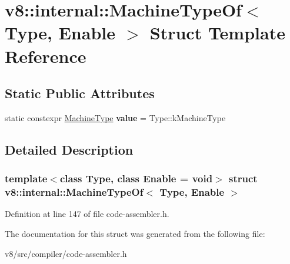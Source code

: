 \hypertarget{structv8_1_1internal_1_1MachineTypeOf}{}\section{v8\+:\+:internal\+:\+:Machine\+Type\+Of$<$ Type, Enable $>$ Struct Template Reference}
\label{structv8_1_1internal_1_1MachineTypeOf}
\subsection*{Static Public Attributes}
\begin{DoxyCompactItemize}
\item 
\mbox{\label{structv8_1_1internal_1_1MachineTypeOf_a9c0063a65ce3b21651a0551cf1a30930}} 
static constexpr \mbox{\hyperlink{classv8_1_1internal_1_1MachineType}{Machine\+Type}} {\bfseries value} = Type\+::k\+Machine\+Type
\end{DoxyCompactItemize}


\subsection{Detailed Description}
\subsubsection*{template$<$class Type, class Enable = void$>$\newline
struct v8\+::internal\+::\+Machine\+Type\+Of$<$ Type, Enable $>$}



Definition at line 147 of file code-\/assembler.\+h.



The documentation for this struct was generated from the following file\+:\begin{DoxyCompactItemize}
\item 
v8/src/compiler/code-\/assembler.\+h\end{DoxyCompactItemize}
